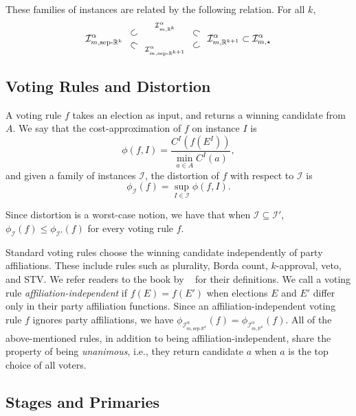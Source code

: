 \documentclass[letterpaper]{article} %
\newcommand{\citet}[1]{\citeauthor{#1}~\shortcite{#1}}
\theoremstyle{definition}
\newcommand{\upsubset}{\mathbin{\rotatebox[origin=c]{30}{$\subset$}}}
\newcommand{\downsubset}{\mathbin{\rotatebox[origin=c]{-30}{$\subset$}}}
\newcommand{\bbR}{\mathbb{R}}
\newcommand{\calI}{\mathcal{I}}
\newcommand{\all}{\star}
\newcommand{\sep}{\textrm{sep-}}
\newcommand{\euc}[1]{\bbR^{#1}}
\newcommand{\eucsep}[1]{\sep\euc{#1}}
\newcommand{\I}{\calI}
\begin{document}
These families of instances are related by the following relation. For all $k$,
$$
\I^{\alpha}_{m,\eucsep{k}} \ \
\substack{\upsubset \\[0.1cm] \downsubset} \ \
\substack{\I^{\alpha}_{m,\euc{k}} \\[0.5cm] \I^{\alpha}_{m,\eucsep{k+1}}} \ \
\substack{\downsubset \\[0.1cm] \upsubset} \ \
\I^{\alpha}_{m,\euc{k+1}} \subset \I^{\alpha}_{m,\all}
$$

\subsection{Voting Rules and Distortion}

A voting rule $f$ takes an election as input, and returns a winning candidate from $A$. We say that the cost-approximation of $f$ on instance $I$ is
$$
\phi(f,I) = \frac{C^I(f(E^I))}{\min_{a \in A} C^I(a)},
$$
and given a family of instances $\calI$, the distortion of $f$ with respect to $\calI$ is
$$
\phi_{\calI}(f) = \sup_{I \in \calI} \phi(f,I).
$$


Since distortion is a worst-case notion, we have that when $\calI \subseteq \calI'$, $\phi_{\calI}(f) \le \phi_{\calI'}(f)$ for every voting rule $f$.

Standard voting rules choose the winning candidate independently of party affiliations. These include rules such as plurality, Borda count, $k$-approval, veto, and STV. We refer readers to the book by \citet{BCELP16} for their definitions. We call a voting rule \emph{affiliation-independent} if $f(E) = f(E')$ when elections $E$ and $E'$ differ only in their party affiliation functions. Since an affiliation-independent voting rule $f$ ignores party affiliations, we have $\phi_{\I^{\alpha}_{m,\eucsep{k}}}(f) = \phi_{\I^{\alpha}_{m,\euc{k}}}(f)$. All of the above-mentioned rules, in addition to being affiliation-independent, share the property of being \emph{unanimous}, i.e., they return candidate $a$ when $a$ is the top choice of all voters.

\subsection{Stages and Primaries}
\end{document}
